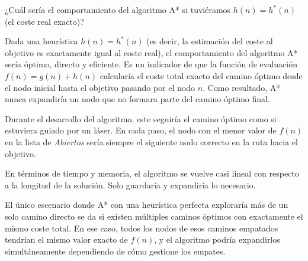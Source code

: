 \documentclass[11pt, a4paper]{article}
\newenvironment{problem}[1][Cuestión]{
	\vspace{0.5cm}
	\noindent{\Large\bfseries #1} \par\vspace{0.5cm}
}{
	\vspace{0.5cm}
}
\begin{document}
	\begin{problem}[Cuestión 4 (10\%)]
		¿Cuál sería el comportamiento del algoritmo A* si tuviéramos $h(n) = h^*(n)$ (el coste real exacto)?

		{ \color{blue} 
			Dada una heurística $h(n)=h^*(n)$ (es decir, la estimación del coste al objetivo es exactamente igual al coste real), el comportamiento del algoritmo A* sería óptimo, directo y eficiente. Es un indicador de que la función de evaluación $f(n)=g(n)+h(n)$ calcularía el coste total exacto del camino óptimo desde el nodo inicial hasta el objetivo pasando por el nodo $n$. Como resultado, A* nunca expandiría un nodo que no formara parte del camino óptimo final.

			Durante el desarrollo del algoritmo, este seguiría el camino óptimo como si estuviera guiado por un láser. En cada paso, el nodo con el menor valor de $f(n)$ en la lista de \textit{Abiertos} sería siempre el siguiente nodo correcto en la ruta hacia el objetivo.

			En términos de tiempo y memoria, el algoritmo se vuelve casi lineal con respecto a la longitud de la solución. Solo guardaría y expandiría lo necesario.

			El único escenario donde A* con una heurística perfecta exploraría más de un solo camino directo se da si existen múltiples caminos óptimos con exactamente el mismo coste total. En ese caso, todos los nodos de esos caminos empatados tendrían el mismo valor exacto de $f(n)$, y el algoritmo podría expandirlos simultáneamente dependiendo de cómo gestione los empates.
		}

		\vspace{3cm}
	\end{problem}
\end{document}
